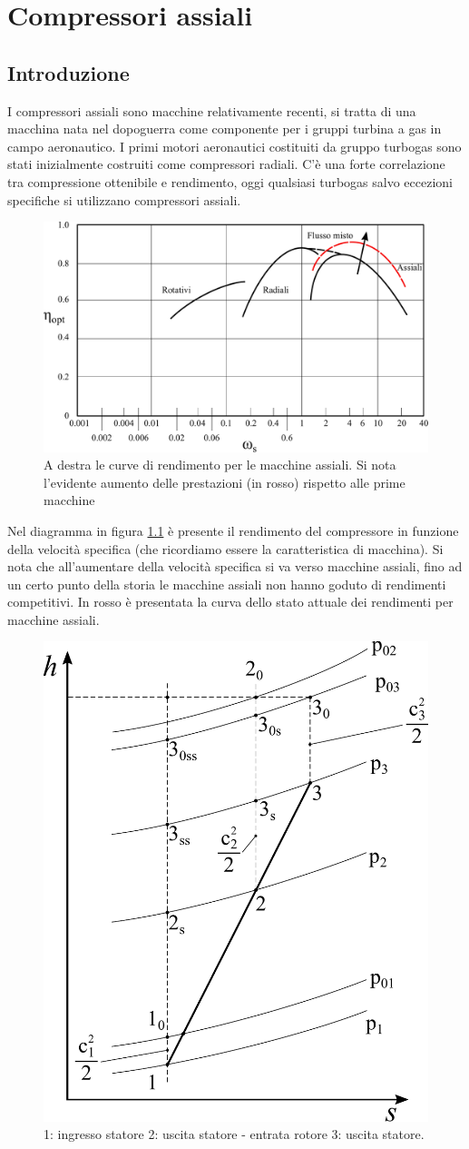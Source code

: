 \chapter{Compressori assiali}

\section{Introduzione}
I compressori assiali sono macchine relativamente recenti, si tratta di una macchina nata nel dopoguerra come componente per i gruppi turbina a gas in campo aeronautico. I primi motori aeronautici costituiti da gruppo turbogas sono stati inizialmente costruiti come compressori radiali. C'è una forte correlazione tra compressione ottenibile e rendimento, oggi qualsiasi turbogas salvo eccezioni specifiche si utilizzano compressori assiali. 
\begin{figure}[h!]
\centering
  \includegraphics[width=.8\textwidth]{fig/PrestComp.pdf}
\caption{A destra le curve di rendimento per le macchine assiali. Si nota l'evidente aumento delle prestazioni (in rosso) rispetto alle prime macchine}
\label{fig:PrestComp}
\end{figure}
Nel diagramma in figura \ref{fig:PrestComp} è presente il rendimento del compressore in funzione della velocità specifica (che ricordiamo essere la caratteristica di macchina). Si nota che all'aumentare della velocità specifica si va verso macchine assiali, fino ad un certo punto della storia le macchine assiali non hanno goduto di rendimenti competitivi. In rosso è presentata la curva dello stato attuale dei rendimenti per macchine assiali. 
\begin{figure}
\centering
  \includegraphics[width=.4\textwidth]{fig/hsComp.pdf}
\caption{1: ingresso statore 2: uscita statore - entrata rotore 3: uscita statore.}
\label{fig:hsComp}
\end{figure}
